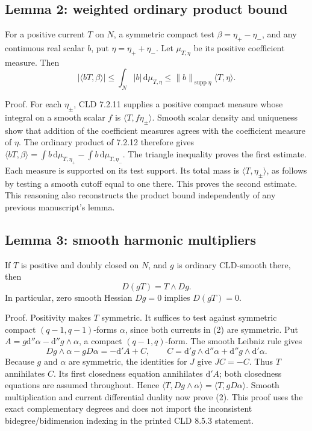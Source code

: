 \documentclass[11pt]{article}
\begin{document}
\subsection{Lemma 2: weighted ordinary product bound}

For a positive current \(T\) on \(N\), a symmetric compact test \(\beta=\eta_+-\eta_-\), and any continuous real scalar \(b\), put \(\eta=\eta_++\eta_-\). Let \(\mu_{T,\eta}\) be its positive coefficient measure. Then
\[
 |\langle bT,\beta\rangle|
 \leq\int_N |b|\,\mathrm d\mu_{T,\eta}
 \leq\|b\|_{\operatorname{supp}\eta}\langle T,\eta\rangle.\tag{1}
\]

Proof. For each \(\eta_\pm\), CLD 7.2.11 supplies a positive compact measure whose integral on a smooth scalar \(f\) is \(\langle T,f\eta_\pm\rangle\). Smooth scalar density and uniqueness show that addition of the coefficient measures agrees with the coefficient measure of \(\eta\). The ordinary product of 7.2.12 therefore gives \(\langle bT,\beta\rangle=\int b\,\mathrm d\mu_{T,\eta_+}-\int b\,\mathrm d\mu_{T,\eta_-}\). The triangle inequality proves the first estimate. Each measure is supported on its test support. Its total mass is \(\langle T,\eta_\pm\rangle\), as follows by testing a smooth cutoff equal to one there. This proves the second estimate. This reasoning also reconstructs the product bound independently of any previous manuscript's lemma.

\subsection{Lemma 3: smooth harmonic multipliers}

If \(T\) is positive and doubly closed on \(N\), and \(g\) is ordinary CLD-smooth there, then
\[
 D(gT)=T\wedge Dg.\tag{2}
\]
In particular, zero smooth Hessian \(Dg=0\) implies \(D(gT)=0\).

Proof. Positivity makes \(T\) symmetric. It suffices to test against symmetric compact \((q-1,q-1)\)-forms \(\alpha\), since both currents in (2) are symmetric. Put \(A=g\mathrm d''\alpha-\mathrm d''g\wedge\alpha\), a compact \((q-1,q)\)-form. The smooth Leibniz rule gives
\[
 Dg\wedge\alpha-gD\alpha
 =-\mathrm d'A+C,
 \qquad C=\mathrm d'g\wedge\mathrm d''\alpha+\mathrm d''g\wedge\mathrm d'\alpha.
\]
Because \(g\) and \(\alpha\) are symmetric, the identities for \(J\) give \(JC=-C\). Thus \(T\) annihilates \(C\). Its first closedness equation annihilates \(\mathrm d'A\); both closedness equations are assumed throughout. Hence \(\langle T,Dg\wedge\alpha\rangle=\langle T,gD\alpha\rangle\). Smooth multiplication and current differential duality now prove (2). This proof uses the exact complementary degrees and does not import the inconsistent bidegree/bidimension indexing in the printed CLD 8.5.3 statement.
\end{document}
